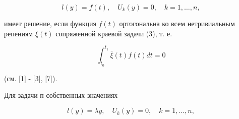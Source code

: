 \documentclass[10pt]{article}
\begin{document}
\[

l(y)=f(t), \quad U_{k}(y)=0, \quad k=1, \ldots, n,

\]



имеет решение, если функция $f(t)$ ортогональна ко всем нетривиальным репениям $\xi(t)$ сопряженной краевой задачи (3), т. е.



\[

\int_{t_{0}}^{t_{1}} \bar{\xi}(t) f(t) d t=0

\]



(см. [1] - [3], [7]).



Для задачи п собственных значениях



\[

l(y)=\lambda y, \quad U_{k}(y)=0, \quad k=1, \ldots, n,

\]
\end{document}
